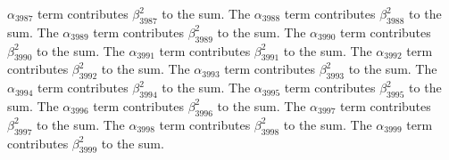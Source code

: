 \begin{lemma}
$\alpha_{3987}$ term contributes $\beta_{3987}^{2}$ to the sum. The $\alpha_{3988}$ term contributes $\beta_{3988}^{2}$ to the sum. The $\alpha_{3989}$ term contributes $\beta_{3989}^{2}$ to the sum. The $\alpha_{3990}$ term contributes $\beta_{3990}^{2}$ to the sum. The $\alpha_{3991}$ term contributes $\beta_{3991}^{2}$ to the sum. The $\alpha_{3992}$ term contributes $\beta_{3992}^{2}$ to the sum. The $\alpha_{3993}$ term contributes $\beta_{3993}^{2}$ to the sum. The $\alpha_{3994}$ term contributes $\beta_{3994}^{2}$ to the sum. The $\alpha_{3995}$ term contributes $\beta_{3995}^{2}$ to the sum. The $\alpha_{3996}$ term contributes $\beta_{3996}^{2}$ to the sum. The $\alpha_{3997}$ term contributes $\beta_{3997}^{2}$ to the sum. The $\alpha_{3998}$ term contributes $\beta_{3998}^{2}$ to the sum. The $\alpha_{3999}$ term contributes $\beta_{3999}^{2}$ to the sum.
\end{lemma}